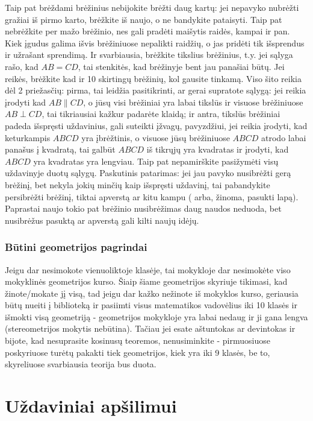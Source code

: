 Taip pat brėždami brėžinius  nebijokite brėžti daug kartų: jei
nepavyko nubrėžti gražiai iš pirmo karto, brėžkite iš naujo, o ne bandykite
pataisyti. Taip pat nebrėžkite per mažo brėžinio, nes gali pradėti maišytis
raidės, kampai ir pan. Kiek įgudus galima išvis brėžiniuose nepalikti raidžių,
o jas pridėti tik išsprendus ir užrašant sprendimą.
 Ir svarbiausia, brėžkite tikslius brėžinius, t.y.
jei sąlyga rašo, kad $AB={CD}$, tai stenkitės, kad brėžinyje bent jau
panašiai būtų. Jei reikės, brėžkite kad ir 10 skirtingų brėžinių, kol
gausite tinkamą.  Viso šito reikia dėl 2 priežasčių: pirma, tai leidžia
pasitikrinti, ar gerai supratote sąlygą: jei reikia įrodyti kad
$AB\parallel{CD}$, o jūsų visi brėžiniai yra labai tikslūs ir visuose
brėžiniuose $AB\perp{CD}$, tai tikriausiai kažkur padarėte klaidą; ir
antra, tikslūs brėžiniai padeda išspręsti uždavinius, gali suteikti įžvagų,
pavyzdžiui, jei reikia įrodyti, kad keturkampis $ABCD$ yra įbrėžtinis, o
visuose jūsų brėžiniuose $ABCD$ atrodo labai panašus į kvadratą, tai galbūt
$ABCD$ iš tikrųjų yra kvadratas ir įrodyti, kad $ABCD$ yra kvadratas yra
lengviau. Taip pat
nepamirškite pasižymėti visų uždavinyje duotų sąlygų. Paskutinis
patarimas: jei jau pavyko nusibrėžti gerą brėžinį, bet nekyla jokių minčių kaip
išspręsti uždavinį, tai pabandykite persibrėžti brėžinį, tiktai apverstą ar
kitu kampu ( arba, žinoma, pasukti lapą).  Paprastai naujo tokio pat 
brėžinio nusibrėžimas daug naudos
neduoda, bet nusibrėžus pasuktą ar apverstą gali kilti naujų idėjų. 

\subsubsection{Būtini geometrijos pagrindai}

Jeigu dar nesimokote vienuoliktoje klasėje, tai mokykloje dar nesimokėte
viso mokyklinės geometrijos kurso. Šiaip šiame geometrijos skyriuje
tikimasi, kad žinote/mokate jį visą, tad jeigu dar kažko nežinote iš
mokyklos kurso, geriausia būtų nueiti į biblioteką ir pasiimti visus
matematikos vadovėlius iki 10 klasės ir išmokti visą geometriją -
geometrijos mokykloje yra labai nedaug ir ji gana lengva (stereometrijos
mokytis nebūtina). Tačiau jei esate aštuntokas ar devintokas ir bijote, kad
nesuprasite kosinusų teoremos, nenusiminkite - pirmuosiuose poskyriuose
turėtų pakakti tiek geometrijos, kiek yra iki 9 klasės, be to, skyreliuose
svarbiausia teorija bus duota.

\newpage
\section{Uždaviniai apšilimui} 
  
